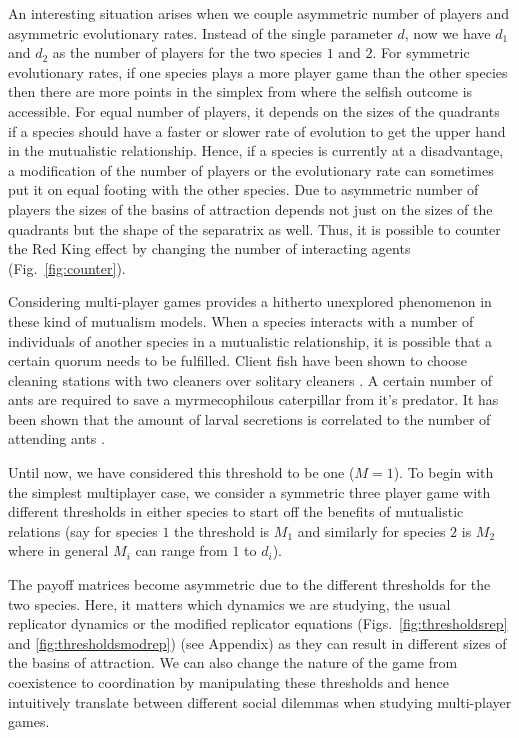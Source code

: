 \documentclass[a4paper]{scrartcl}
\begin{document}
An interesting situation arises when we couple asymmetric number of players and asymmetric evolutionary rates. 
Instead of the single parameter $d$, now we have $d_1$ and $d_2$ as the number of players for the two species $1$ and $2$.
For symmetric evolutionary rates, if one species plays a more player game than the other species then there are more points in the simplex from where the selfish outcome is accessible.
For equal number of players, it depends on the sizes of the quadrants if a species should have a faster or slower rate of evolution to get the upper hand in the mutualistic relationship.
Hence, if a species is currently at a disadvantage, a modification of the number of players or the evolutionary rate can sometimes put it on equal footing with the other species. 
Due to asymmetric number of players the sizes of the basins of attraction depends not just on the sizes of the quadrants but the shape of the separatrix as well.
Thus, it is possible to counter the Red King effect by changing the number of interacting agents (Fig.\ \ref{fig:counter}).

Considering multi-player games provides a hitherto unexplored phenomenon in these kind of mutualism models.
When a species interacts with a number of individuals of another species in a mutualistic relationship, it is possible that a certain quorum needs to be fulfilled.
Client fish have been shown to choose cleaning stations with two cleaners over solitary cleaners \citep{bshary:2002aa}.
A certain number of ants are required to save a myrmecophilous caterpillar from it's predator.
It has been shown that the amount of larval secretions is correlated to the number of attending ants \citep{axen:1998aa}.

Until now, we have considered this threshold to be one ($M=1$).
To begin with the simplest multiplayer case, we consider
a symmetric three player game with different thresholds in either species to start off the benefits of mutualistic relations (say for species $1$ the threshold is $M_1$ and similarly for species $2$ is $M_2$ where in general $M_i$ can range from $1$ to $d_i$).

The payoff matrices become asymmetric due to the different thresholds for the two species.
Here, it matters which dynamics we are studying, the usual replicator dynamics or the modified replicator equations (Figs.\ \ref{fig:thresholdsrep} and \ref{fig:thresholdsmodrep}) (see Appendix) as they can result in different sizes of the basins of attraction.
We can also change the nature of the game from coexistence to coordination by manipulating these thresholds \citep{souza:2009aa} and hence intuitively translate between different social dilemmas when studying multi-player games.
\end{document}
